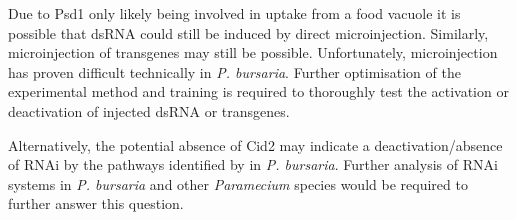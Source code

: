 Due to Psd1 only likely being involved in uptake from a food vacuole it is possible
that dsRNA could still be induced by direct microinjection.  Similarly, 
microinjection of transgenes may still be possible.  Unfortunately, microinjection
has proven difficult technically in \textit{P. bursaria}.  Further optimisation
of the experimental method and training is required to thoroughly test
the activation or deactivation of injected dsRNA or transgenes.

Alternatively, the potential absence of Cid2 may indicate a deactivation/absence
of RNAi by the pathways identified by \citep{Marker2014} in \textit{P. bursaria}.
Further analysis of RNAi systems in \textit{P. bursaria} and other \textit{Paramecium}
species would be required to further answer this question.



